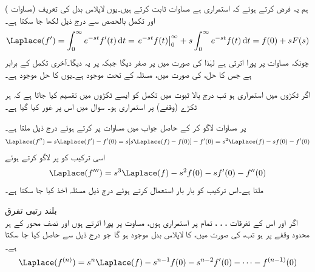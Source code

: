 ہم یہ  فرض کرتے ہوئے  کہ   استمراری ہے مساوات  ثابت کرتے ہیں۔یوں لاپلاس بدل کی تعریف (مساوات ) اور تکمل بالحصص سے درج ذیل لکھا جا سکتا ہے۔
\begin{align*}
\Laplace(f')=\int_{0}^{\infty} e^{-st} f'(t)\dif t=\left. e^{-st} f(t) \right|_{0}^{\infty}+s\int_{0}^{\infty} e^{-st}f(t)\dif t=f(0)+sF(s)
\end{align*}
چونکہ  مساوات  پر پورا اترتی ہے لہٰذا  کی صورت میں   پر صفر دیگا جبکہ  پر یہ  دیگا۔آخری تکمل  کے برابر ہے  جس کا حل،  کی  صورت میں، مسئلہ  کے تحت موجود ہے۔یوں  کا حل موجود ہے۔

اگر  ٹکڑوں میں استمراری ہو تب درج بالا ثبوت میں تکمل کو ایسے ٹکڑوں میں تقسیم کیا جاتا ہے کہ ہر ٹکڑے (وقفے) پر  استمراری ہو۔ سوال  میں اس پر غور کیا گیا ہے۔

 پر مساوات   لاگو کر کے حاصل جواب میں مساوات  پر کرتے ہوئے درج ذیل ملتا ہے۔
\begin{align}\label{مساوات_لاپلاس_درجہ_دوم_تفرق}
\Laplace(f'')=s\Laplace(f')-f'(0)=s[s\Laplace(f)-f(0)]-f'(0)=s^2\Laplace(f)-sf(0)-f'(0)
\end{align}
اسی ترکیب کو  پر لاگو کرتے ہوئے
\begin{align}\label{مساوات_لاپلاس_درجہ_تین_تفرق}
\Laplace(f''')=s^3\Laplace(f)-s^2f(0)-sf'(0)-f''(0)
\end{align}
ملتا ہے۔اس ترکیب کو بار بار استعمال کرتے ہوئے درج ذیل مسئلہ اخذ کیا جا سکتا ہے۔

\quad بلند رتبی تفرق \\
اگر  اور اس کے تفرقات ، ، ،   تمام  پر استمراری ہوں، مساوت  پر پورا اترتے ہوں اور  نصف محور  کے ہر محدود وقفے پر  ہو تب،  کی صورت میں،  کا لاپلاس بدل موجود ہو گا جو درج ذیل سے حاصل کیا جا سکتا ہے۔
\begin{align}\label{مساوات_لاپلاس_بلند_درجی_تفرق}
\Laplace(f^{(n)})=s^n\Laplace(f)-s^{n-1}f(0)-s^{n-2}f'(0)-\cdots -f^{(n-1)}(0)
\end{align}

